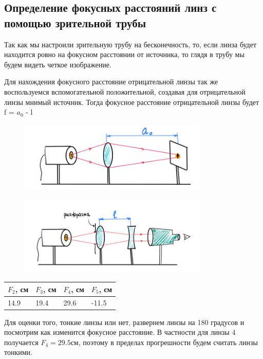 \documentclass[a4paper,12pt]{article}
\theoremstyle{definition}
\begin{document}
\subsection{ Определение фокусных расстояний линз с помощью зрительной трубы}

Так как мы настроили зрительную трубу на бесконечность, то, если линза будет находится ровно на фокусном расстоянии от источника, то глядя в трубу мы будем видеть четкое изображение.

Для нахождения фокусного расстояние отрицательной линзы так же воспользуемся вспомогательной положительной, создавая для отрицательной линзы мнимый источник. Тогда фокусное расстояние отрицательной линзы будет f = $a_0$ - l


\begin{figure}[h]
    \centering
    \includegraphics[width=9cm]{d1.jpg}
    \label{fig:vac}
\end{figure}

\begin{figure}[h!]
    \centering
    \includegraphics[width=9cm]{d2.jpg}
    \label{fig:vac}
\end{figure}

\begin{table}[h!]
    \centering
    \begin{tabular}{|l|l|l|l|}
    \hline
    $F_2$, см  & $F_3$, см & $F_4$, см  & $F_5$, см  \\ \hline
    14.9 & 19.4 & 29.6 & -11.5 \\ \hline
    \end{tabular}
\end{table}
Для оценки того, тонкие линзы или нет, развернем линзы на 180 градусов и посмотрим как изменится фокусное расстояние. В частности для линзы 4 получается $F_4 = 29.5 см$, поэтому в пределах прогрешности будем считать линзы тонкими.
\end{document}

